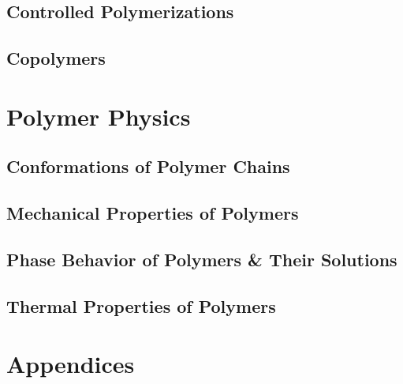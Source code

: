 \documentclass[book]{pogil}
\begin{document}
	\chapter{Controlled Polymerizations}

	\chapter{Copolymers}
		

\part{Polymer Physics}

	\chapter{Conformations of Polymer Chains}
		

	\chapter{Mechanical Properties of Polymers}
		
		
		

	\chapter{Phase Behavior of Polymers \& Their Solutions}
		
		
		

	\chapter{Thermal Properties of Polymers}


\part{Appendices}

\appendix

	


\backmatter
\end{document}
